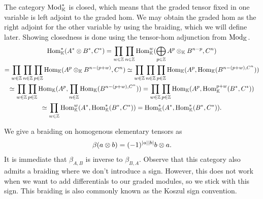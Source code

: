 \documentclass[../thesis.tex]{subfiles}
\begin{document}
            The category $\tt{Mod}_\mathbb{K}^*$ is closed, which means that the graded tensor fixed in one variable is left adjoint to the graded hom. We may obtain the graded hom as the right adjoint for the other variable by using the braiding, which we will define later. Showing closedness is done using the tensor-hom adjunction from $\tt{Mod}_\mathbb{K}$.
            \begin{multline*}
                \tt{Hom}_\mathbb{K}^*(A^*\otimes B^*, C^*) = \prod_{w\in\mathbb{Z}}\prod_{n\in\mathbb{Z}}\tt{Hom}_\mathbb{K}^w(\bigoplus_{p\in\mathbb{Z}}A^p\otimes_\mathbb{K}B^{n-p},C^n) \\
                = \prod_{w\in\mathbb{Z}}\prod_{n\in\mathbb{Z}}\prod_{p\in\mathbb{Z}}\tt{Hom}_\mathbb{K}(A^p\otimes_\mathbb{K} B^{n-(p+w)},C^n) \simeq \prod_{w\in\mathbb{Z}}\prod_{n\in\mathbb{Z}}\prod_{p\in\mathbb{Z}}\tt{Hom}_\mathbb{K}(A^p,\tt{Hom}_\mathbb{K}(B^{n-(p+w),C^n})) \\
                \simeq \prod_{w\in\mathbb{Z}}\prod_{p\in\mathbb{Z}}\tt{Hom}_\mathbb{K}(A^p, \prod_{n\in\mathbb{Z}}\tt{Hom}_\mathbb{K}(B^{n-(p+w),C^n})) = \prod_{w\in\mathbb{Z}}\prod_{p\in\mathbb{Z}}\tt{Hom}_\mathbb{K}(A^p,\tt{Hom}_\mathbb{K}^{p+w}(B^*,C^*)) \\
                \simeq \prod_{w\in\mathbb{Z}}\tt{Hom}_\mathbb{K}^w(A^*,\tt{Hom}_\mathbb{K}^*(B^*,C^*)) = \tt{Hom}_\mathbb{K}^*(A^*,\tt{Hom}_\mathbb{K}^*(B^*,C^*))\tt{.}
            \end{multline*}
            
            We give a braiding on homogenous elementary tensors as
            \begin{align*}
                \beta(a\otimes b) = (-1)^{|a||b|}b\otimes a\tt{.}
            \end{align*}
            It is immediate that $\beta_{A,B}$ is inverse to $\beta_{B,A}$. Observe that this category also admits a braiding where we don't introduce a sign. However, this does not work when we want to add differentials to our graded modules, so we stick with this sign. This braiding is also commonly known as the Koszul sign convention. 
\end{document}

